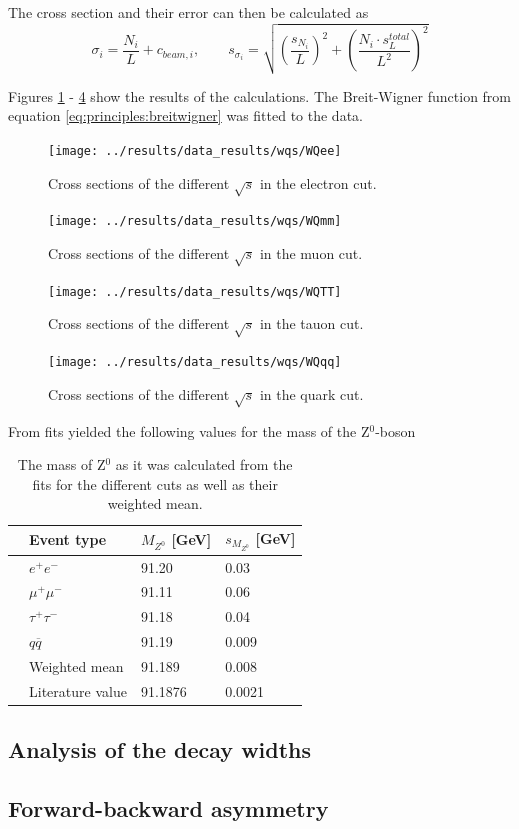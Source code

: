 The cross section and their error can then be calculated as
\begin{equation}
\sigma_i=\frac{N_i}{L}+c_{beam,i}, \qquad s_{\sigma_i}=\sqrt{(\frac{s_{N_i}}{L})^2+(\frac{N_i\cdot s_L^{total}}{L^2})^2}
\end{equation}

Figures \ref{fig:WQee} - \ref{fig:WQqq} show the results of the calculations. The Breit-Wigner function from equation \ref{eq:principles:breitwigner} was fitted to the data.

\begin{figure}[H]
\centering
\texttt{[image: ../results/data\_results/wqs/WQee]}
\caption[Cross sections for electron cut]{Cross sections of the different $\sqrt{s}$ in the electron cut.}
\label{fig:WQee}
\end{figure}

\begin{figure}
\centering
\texttt{[image: ../results/data\_results/wqs/WQmm]}
\caption[Cross sections for muon cut]{Cross sections of the different $\sqrt{s}$ in the muon cut.}
\label{fig:WQmm}
\end{figure}

\begin{figure}
	\centering
	\texttt{[image: ../results/data\_results/wqs/WQTT]}
	\caption[Cross sections for tauon cut]{Cross sections of the different $\sqrt{s}$ in the tauon cut.}
	\label{fig:WQTT}
\end{figure}

\begin{figure}
\centering
\texttt{[image: ../results/data\_results/wqs/WQqq]}
\caption[Cross sections for quark cut]{Cross sections of the different $\sqrt{s}$ in the quark cut.}
\label{fig:WQqq}
\end{figure}

From fits yielded the following values for the mass of the Z$^0$-boson
\begin{table}[H]\centering
	\begin{tabular}{@{}llll@{}}
		\toprule
		&Event type&$M_{Z^0}$ [GeV]&$s_{M_{Z^0}}$ [GeV]\\
		\midrule
		&$e^+e^-$&91.20&0.03\\
		&$\mu^+\mu^-$&91.11&0.06\\
		&$\tau^+\tau^-$&91.18&0.04\\
		&$q\overline{q}$&91.19&0.009\\
		\midrule
		&Weighted mean&91.189&0.008\\
		&Literature value&91.1876&0.0021\\
		\bottomrule
	\end{tabular}
	\caption[Fitresults for $M_{Z^0}$]{The mass of Z$^0$ as it was calculated from the fits for the different cuts as well as their weighted mean.}
	\label{tb:Z0massfitresults}
\end{table}



\subsection{Analysis of the decay widths}
\subsection{Forward-backward asymmetry}



